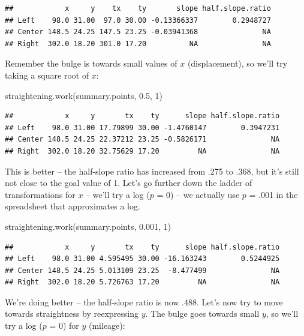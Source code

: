 \documentclass[
]{book}
\newenvironment{Shaded}{\begin{snugshade}}{\end{snugshade}}
\newcommand{\DecValTok}[1]{\textcolor[rgb]{0.00,0.00,0.81}{#1}}
\newcommand{\FloatTok}[1]{\textcolor[rgb]{0.00,0.00,0.81}{#1}}
\newcommand{\FunctionTok}[1]{\textcolor[rgb]{0.00,0.00,0.00}{#1}}
\newcommand{\NormalTok}[1]{#1}
\begin{document}
\begin{verbatim}
##            x     y    tx    ty       slope half.slope.ratio
## Left    98.0 31.00  97.0 30.00 -0.13366337        0.2948727
## Center 148.5 24.25 147.5 23.25 -0.03941368               NA
## Right  302.0 18.20 301.0 17.20          NA               NA
\end{verbatim}

Remember the bulge is towards small values of \(x\) (displacement), so we'll try taking a square root of \(x\):

\begin{Shaded}
\begin{Highlighting}[]
\FunctionTok{straightening.work}\NormalTok{(summary.points, }\FloatTok{0.5}\NormalTok{, }\DecValTok{1}\NormalTok{)}
\end{Highlighting}
\end{Shaded}

\begin{verbatim}
##            x     y       tx    ty      slope half.slope.ratio
## Left    98.0 31.00 17.79899 30.00 -1.4760147        0.3947231
## Center 148.5 24.25 22.37212 23.25 -0.5826171               NA
## Right  302.0 18.20 32.75629 17.20         NA               NA
\end{verbatim}

This is better -- the half-slope ratio has increased from .275 to .368, but it's still not close to the goal value of 1. Let's go further down the ladder of transformations for \(x\) -- we'll try a log (\(p\) = 0) -- we actually use \(p\) = .001 in the spreadsheet that approximates a log.

\begin{Shaded}
\begin{Highlighting}[]
\FunctionTok{straightening.work}\NormalTok{(summary.points, }\FloatTok{0.001}\NormalTok{, }\DecValTok{1}\NormalTok{)}
\end{Highlighting}
\end{Shaded}

\begin{verbatim}
##            x     y       tx    ty      slope half.slope.ratio
## Left    98.0 31.00 4.595495 30.00 -16.163243        0.5244925
## Center 148.5 24.25 5.013109 23.25  -8.477499               NA
## Right  302.0 18.20 5.726763 17.20         NA               NA
\end{verbatim}

We're doing better -- the half-slope ratio is now .488. Let's now try to move towards straightness by reexpressing \(y\). The bulge goes towards small \(y\), so we'll try a log (\(p\) = 0) for \(y\) (mileage):
\end{document}
